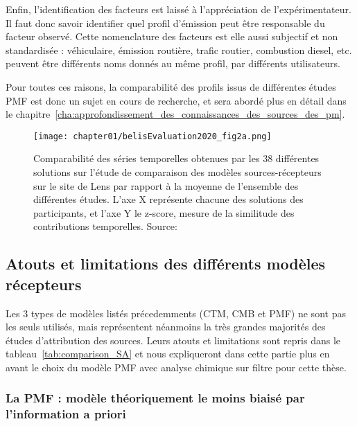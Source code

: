 Enfin, l'identification des facteurs est laissé à l'appréciation de l'expérimentateur. Il
faut donc savoir identifier quel profil d'émission peut être responsable du facteur
observé. Cette nomenclature des facteurs est elle aussi subjectif et non standardisée :
véhiculaire, émission routière, trafic routier, combustion diesel, etc. peuvent être
différents noms donnés au même profil, par différents utilisateurs.

Pour toutes ces raisons, la comparabilité des profils issus de différentes études PMF
est donc un sujet en cours de recherche, et sera abordé plus en détail dans le
chapitre~\ref{cha:approfondissement_des_connaissances_des_sources_des_pm}.

\begin{figure}[ht]
    \centering
    \texttt{[image: chapter01/belisEvaluation2020\_fig2a.png]}
    \caption{Comparabilité des séries temporelles obtenues par les 38 différentes solutions
    sur l'étude de comparaison des modèles sources-récepteurs sur le site de Lens par
    rapport à la moyenne de l'ensemble des différentes études. L'axe X représente chacune des
    solutions des participants, et l'axe Y le z-score, mesure de la similitude des
contributions temporelles. Source: \textcite{belisEvaluation2020}}%
    \label{fig:chapter01/belisEvaluation2020_fig2a}
\end{figure}

\subsection{Atouts et limitations des différents modèles récepteurs}%
\label{ssub:atouts_et_limitations_des_différents_modèles_récepteurs}

Les 3 types de modèles listés précedemments (CTM, CMB et PMF) ne sont pas les seuls
utilisés, mais représentent néanmoins la très grandes majorités des études d'attribution
des sources. Leurs atouts et limitations sont repris dans le
tableau~\ref{tab:comparison_SA} et nous expliqueront dans cette partie plus en avant le
choix du modèle PMF avec analyse chimique sur filtre pour cette thèse.

\subsubsection{La PMF : modèle théoriquement le moins biaisé par l'information a priori}%
\label{ssub:choix_du_modèle_pmf}

